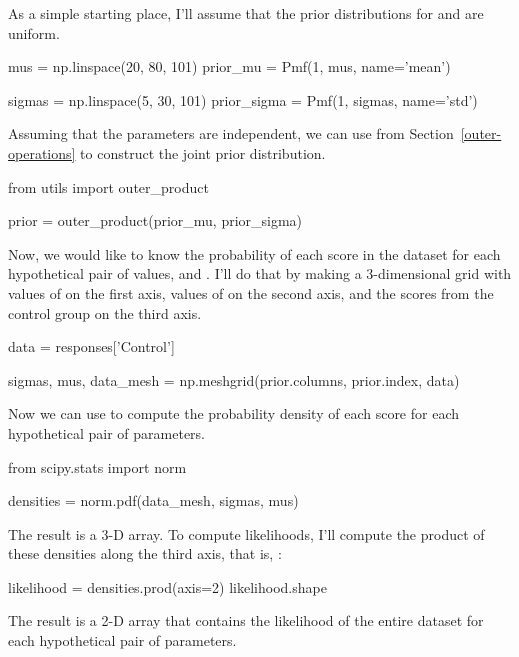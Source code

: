 \documentclass[12pt]{book}
\theoremstyle{exercise}
\begin{document}
As a simple starting place, I'll assume that the prior distributions for
 and  are
uniform.

\begin{code}
mus = np.linspace(20, 80, 101)
prior_mu = Pmf(1, mus, name='mean')

sigmas = np.linspace(5, 30, 101)
prior_sigma = Pmf(1, sigmas, name='std')
\end{code}

Assuming that the parameters are independent, we can use  from Section~\ref{outer-operations} to construct the joint prior distribution.

\begin{code}
from utils import outer_product

prior = outer_product(prior_mu, prior_sigma)
\end{code}

Now, we would like to know the probability of each score in the dataset
for each hypothetical pair of values,  and
. I'll do that by making a 3-dimensional
grid with values of  on the first axis,
values of  on the second axis, and the
scores from the control group on the third axis.

\begin{code}
data = responses['Control']

sigmas, mus, data_mesh = np.meshgrid(prior.columns, 
                                     prior.index, 
                                     data)
\end{code}

Now we can use  to compute the
probability density of each score for each hypothetical pair of
parameters.

\begin{code}
from scipy.stats import norm

densities = norm.pdf(data_mesh, sigmas, mus)
\end{code}

The result is a 3-D array. To compute likelihoods, I'll compute the
product of these densities along the third axis, that is, 
:

\begin{code}
likelihood = densities.prod(axis=2)
likelihood.shape
\end{code}

The result is a 2-D array that contains the likelihood of the entire
dataset for each hypothetical pair of parameters.
\end{document}
